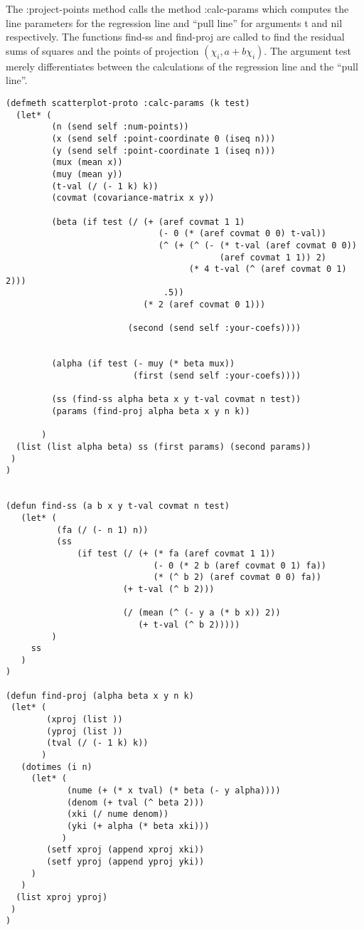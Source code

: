 \documentclass[11pt]{report}
\begin{document}
   The :project-points method calls the method :calc-params which computes
the line parameters for the regression line and ``pull 
line'' for arguments t and nil respectively.
The functions find-ss and find-proj are called to find the residual sums of 
squares and the points of projection $(\chi_i,  a + b \chi_i)$.  The argument
test merely differentiates between the calculations of the regression line 
and the ``pull line''.

\begin{verbatim}
(defmeth scatterplot-proto :calc-params (k test)
  (let* (
         (n (send self :num-points))
         (x (send self :point-coordinate 0 (iseq n)))
         (y (send self :point-coordinate 1 (iseq n)))
         (mux (mean x))
         (muy (mean y))
         (t-val (/ (- 1 k) k))
         (covmat (covariance-matrix x y))

         (beta (if test (/ (+ (aref covmat 1 1) 
                              (- 0 (* (aref covmat 0 0) t-val))
                              (^ (+ (^ (- (* t-val (aref covmat 0 0))
                                          (aref covmat 1 1)) 2)
                                    (* 4 t-val (^ (aref covmat 0 1) 2)))
                               .5))
                           (* 2 (aref covmat 0 1)))
                      
                        (second (send self :your-coefs))))

                  
         (alpha (if test (- muy (* beta mux)) 
                         (first (send self :your-coefs))))

         (ss (find-ss alpha beta x y t-val covmat n test))          
         (params (find-proj alpha beta x y n k))
              
       )
  (list (list alpha beta) ss (first params) (second params))
 )
)


(defun find-ss (a b x y t-val covmat n test)
   (let* (
          (fa (/ (- n 1) n))
          (ss 
              (if test (/ (+ (* fa (aref covmat 1 1)) 
                             (- 0 (* 2 b (aref covmat 0 1) fa))
                             (* (^ b 2) (aref covmat 0 0) fa))
                       (+ t-val (^ b 2)))
                       
                       (/ (mean (^ (- y a (* b x)) 2)) 
                          (+ t-val (^ b 2)))))
         )
     ss
   )
)

(defun find-proj (alpha beta x y n k)
 (let* (
        (xproj (list ))
        (yproj (list ))
        (tval (/ (- 1 k) k))
       ) 
   (dotimes (i n)
     (let* (
            (nume (+ (* x tval) (* beta (- y alpha))))
            (denom (+ tval (^ beta 2)))
            (xki (/ nume denom))
            (yki (+ alpha (* beta xki)))
           )
        (setf xproj (append xproj xki))
        (setf yproj (append yproj yki))
     )
   )
  (list xproj yproj)
 )
)
\end{verbatim}
\end{document}
